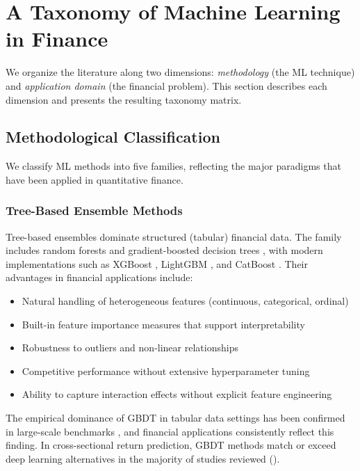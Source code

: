 \section{A Taxonomy of Machine Learning in Finance}\label{sec:taxonomy}

We organize the literature along two dimensions: \textit{methodology} (the ML technique) and \textit{application domain} (the financial problem). This section describes each dimension and presents the resulting taxonomy matrix.

\subsection{Methodological Classification}

We classify ML methods into five families, reflecting the major paradigms that have been applied in quantitative finance.

\subsubsection{Tree-Based Ensemble Methods}

Tree-based ensembles dominate structured (tabular) financial data. The
family includes random forests \citep{Breiman2001} and gradient-boosted
decision trees \citep{Friedman2001}, with modern implementations such as
XGBoost \citep{Chen2016}, LightGBM \citep{Ke2017}, and CatBoost
\citep{Prokhorenkova2018}. Their advantages in financial applications
include:

\begin{itemize}[leftmargin=*]
    \item Natural handling of heterogeneous features (continuous, categorical, ordinal)
    \item Built-in feature importance measures that support interpretability
    \item Robustness to outliers and non-linear relationships
    \item Competitive performance without extensive hyperparameter tuning
    \item Ability to capture interaction effects without explicit feature engineering
\end{itemize}

The empirical dominance of GBDT in tabular data settings has been confirmed in large-scale benchmarks \citep{Grinsztajn2022, ShwartzZiv2022alt}, and financial applications consistently reflect this finding. In cross-sectional return prediction, GBDT methods match or exceed deep learning alternatives in the majority of studies reviewed ().

